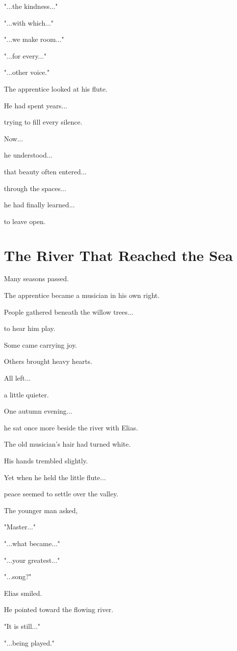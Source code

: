 \documentclass[12pt,openany]{book}
\begin{document}
"...the kindness..."

"...with which..."

"...we make room..."

"...for every..."

"...other voice."

The apprentice looked at his flute.

He had spent years...

trying to fill every silence.

Now...

he understood...

that beauty often entered...

through the spaces...

he had finally learned...

to leave open.
\section*{The River That Reached the Sea}

Many seasons passed.

The apprentice became a musician in his own right.

People gathered beneath the willow trees...

to hear him play.

Some came carrying joy.

Others brought heavy hearts.

All left...

a little quieter.

One autumn evening...

he sat once more beside the river with Elias.

The old musician's hair had turned white.

His hands trembled slightly.

Yet when he held the little flute...

peace seemed to settle over the valley.

The younger man asked,

"Master..."

"...what became..."

"...your greatest..."

"...song?"

Elias smiled.

He pointed toward the flowing river.

"It is still..."

"...being played."
\end{document}
